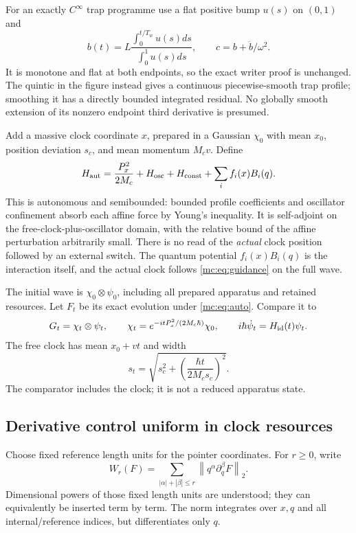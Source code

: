 \documentclass[11pt,oneside,openany]{book}
\theoremstyle{definition}
\theoremstyle{remark}\newtheorem{remark}[theorem]{Remark}
\providecommand{\norm}[1]{\left\lVert#1\right\rVert}
\begin{document}
For an exactly $C^\infty$ trap programme use a flat positive bump $u(s)$ on $(0,1)$ and
\[
 b(t)=L\frac{\int_0^{t/T_w}u(s)ds}{\int_0^1u(s)ds},\qquad
 c=b+\ddot b/\omega^2.
\]
It is monotone and flat at both endpoints, so the exact writer proof is unchanged. The quintic in the figure instead gives a continuous piecewise-smooth trap profile; smoothing it has a directly bounded integrated residual. No globally smooth extension of its nonzero endpoint third derivative is presumed.

Add a massive clock coordinate $x$, prepared in a Gaussian $\chi_0$ with mean $x_0$, position deviation $s_c$, and mean momentum $M_cv$. Define
\begin{equation}\label{mc:eq:auto}
 H_{\rm aut}=\frac{P_x^2}{2M_c}+H_{\rm osc}+H_{\rm const}+
                              \sum_i f_i(x)B_i(q).
\end{equation}
This is autonomous and semibounded: bounded profile coefficients and oscillator confinement absorb each affine force by Young's inequality. It is self-adjoint on the free-clock-plus-oscillator domain, with the relative bound of the affine perturbation arbitrarily small. There is no read of the \emph{actual} clock position followed by an external switch. The quantum potential $f_i(x)B_i(q)$ is the interaction itself, and the actual clock follows \eqref{mc:eq:guidance} on the full wave.

The initial wave is $\chi_0\otimes\psi_0$, including all prepared apparatus and retained resources. Let $F_t$ be its exact evolution under \eqref{mc:eq:auto}. Compare it to
\[
 G_t=\chi_t\otimes\psi_t,\qquad
 \chi_t=e^{-itP_x^2/(2M_c\hbar)}\chi_0,\qquad
 i\hbar\dot\psi_t=H_{\rm id}(t)\psi_t.
\]
The free clock has mean $x_0+vt$ and width
\begin{equation}\label{mc:eq:clockwidth}
 s_t=\sqrt{s_c^2+\left(\frac{\hbar t}{2M_cs_c}\right)^2}.
\end{equation}
The comparator includes the clock; it is not a reduced apparatus state.

\subsection{Derivative control uniform in clock resources}
Choose fixed reference length units for the pointer coordinates. For $r\ge0$, write
\[
 W_r(F)=\sum_{|\alpha|+|\beta|\le r}\norm{q^\alpha\partial_q^\beta F}_2.
\]
Dimensional powers of those fixed length units are understood; they can equivalently be inserted term by term. The norm integrates over $x,q$ and all internal/reference indices, but differentiates only $q$.
\end{document}
